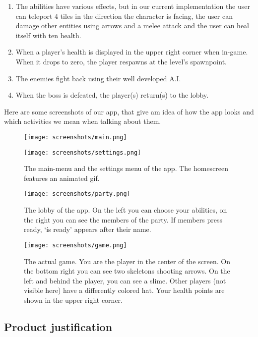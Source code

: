 \documentclass[../main.tex]{subfiles}
\begin{document}
\begin{enumerate}
		\item The abilities have various effects, but in our current implementation the user can teleport 4 tiles in the direction the character is facing, the user can damage other entities using arrows and a melee attack and the user can heal itself with ten health.
		\item When a player's health is displayed in the upper right corner when in-game. When it drops to zero, the player respawns at the level's spawnpoint.		
		\item The enemies fight back using their well developed A.I.
		\item When the boss is defeated, the player(s) return(s) to the lobby.
\end{enumerate}

\noindent
Here are some screenshots of our app, that give am idea of how the app looks and which activities we mean when talking about them. 		
		\begin{figure}[H]
			\centering
			\begin{minipage}{.45\textwidth}
				\centering
				\texttt{[image: screenshots/main.png]}
			\end{minipage}
			\begin{minipage}{.45\textwidth}
				\centering
				\texttt{[image: screenshots/settings.png]}
			\end{minipage}
			\caption{The main-menu and the settings menu of the app. The homescreen features an animated gif.}
		\end{figure}
		
		\begin{figure}[H]
    	\centering
    	\texttt{[image: screenshots/party.png]}
			\caption{The lobby of the app. On the left you can choose your abilities, on the right you can see the members of the party. If members press ready, `ís ready' appears after their name.}
  	\end{figure}
		\begin{figure}[H]
    	\centering
			\texttt{[image: screenshots/game.png]}
			\caption{The actual game. You are the player in the center of the screen. On the bottom right you can see two skeletons shooting arrows. On the left and behind the player, you can see a slime. Other players (not visible here) have a differently colored hat. Your health points are shown in the upper right corner.}
  	\end{figure}
    
	\subsection{Product justification}
\end{document}
